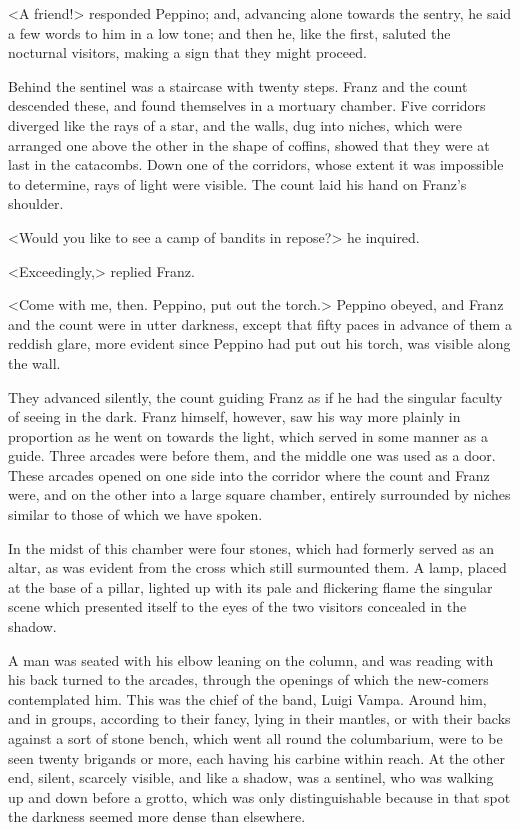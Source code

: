  <A friend!> responded Peppino; and, advancing alone towards the sentry, he said a few words to him in a low tone; and then he, like the first, saluted the nocturnal visitors, making a sign that they might proceed. 

 Behind the sentinel was a staircase with twenty steps. Franz and the count descended these, and found themselves in a mortuary chamber. Five corridors diverged like the rays of a star, and the walls, dug into niches, which were arranged one above the other in the shape of coffins, showed that they were at last in the catacombs. Down one of the corridors, whose extent it was impossible to determine, rays of light were visible. The count laid his hand on Franz's shoulder. 

 <Would you like to see a camp of bandits in repose?> he inquired. 

 <Exceedingly,> replied Franz. 

 <Come with me, then. Peppino, put out the torch.> Peppino obeyed, and Franz and the count were in utter darkness, except that fifty paces in advance of them a reddish glare, more evident since Peppino had put out his torch, was visible along the wall. 

 They advanced silently, the count guiding Franz as if he had the singular faculty of seeing in the dark. Franz himself, however, saw his way more plainly in proportion as he went on towards the light, which served in some manner as a guide. Three arcades were before them, and the middle one was used as a door. These arcades opened on one side into the corridor where the count and Franz were, and on the other into a large square chamber, entirely surrounded by niches similar to those of which we have spoken. 

 In the midst of this chamber were four stones, which had formerly served as an altar, as was evident from the cross which still surmounted them. A lamp, placed at the base of a pillar, lighted up with its pale and flickering flame the singular scene which presented itself to the eyes of the two visitors concealed in the shadow. 

 A man was seated with his elbow leaning on the column, and was reading with his back turned to the arcades, through the openings of which the new-comers contemplated him. This was the chief of the band, Luigi Vampa. Around him, and in groups, according to their fancy, lying in their mantles, or with their backs against a sort of stone bench, which went all round the columbarium, were to be seen twenty brigands or more, each having his carbine within reach. At the other end, silent, scarcely visible, and like a shadow, was a sentinel, who was walking up and down before a grotto, which was only distinguishable because in that spot the darkness seemed more dense than elsewhere. 

